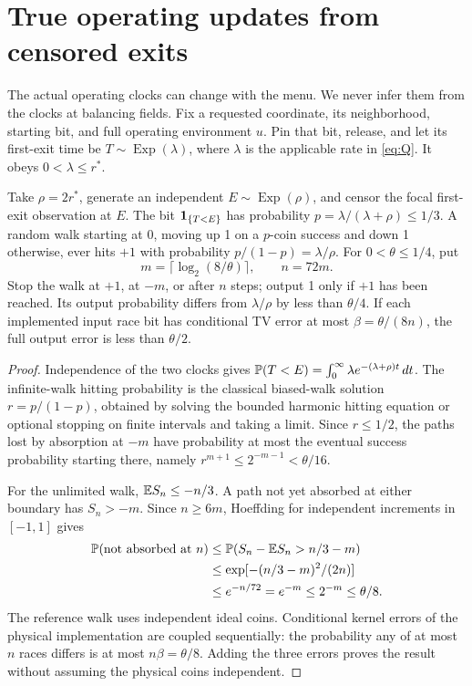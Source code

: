 \section{True operating updates from censored exits}

The actual operating clocks can change with the menu. We never infer them
from the clocks at balancing fields. Fix a requested coordinate, its
neighborhood, starting bit, and full operating environment $u$. Pin that
bit, release, and let its first-exit time be $T\sim\operatorname{Exp}(\lambda)$,
where $\lambda$ is the applicable rate in \eqref{eq:Q}. It obeys
$0<\lambda\le r^*$.

\begin{lemma}\label{lem:walk}
Take $\rho=2r^*$, generate an independent
$E\sim\operatorname{Exp}(\rho)$, and censor the focal first-exit observation
at $E$. The bit $\mathbf 1_{\{T<E\}}$ has probability
$p=\lambda/(\lambda+\rho)\le1/3$.
A random walk starting at 0, moving up 1 on a $p$-coin success and down 1
otherwise, ever hits $+1$ with probability
$p/(1-p)=\lambda/\rho$.
For $0<\theta\le1/4$, put
\[
 m=\lceil\log_2(8/\theta)\rceil,\qquad n=72m .
\]
Stop the walk at $+1$, at $-m$, or after $n$ steps; output 1 only if $+1$
has been reached. Its output probability differs from $\lambda/\rho$ by
less than $\theta/4$. If each implemented input race bit has conditional
TV error at most $\beta=\theta/(8n)$, the full output error is less than
$\theta/2$.
\end{lemma}
\begin{proof}
Independence of the two clocks gives
$\mathbb P(T<E)=\int_0^\infty\lambda e^{-(\lambda+\rho)t}\,dt$.
The infinite-walk hitting probability is the classical biased-walk solution
$r=p/(1-p)$, obtained by solving the bounded harmonic hitting equation or
optional stopping on finite intervals and taking a limit. Since $r\le1/2$,
the paths lost by absorption at $-m$ have probability at most the eventual
success probability starting there, namely $r^{m+1}\le2^{-m-1}<\theta/16$.

For the unlimited walk, $\mathbb E S_n\le-n/3$. A path not yet absorbed at either
boundary has $S_n>-m$. Since $n\ge6m$, Hoeffding for independent increments
in $[-1,1]$ gives
\begin{align*}
 \mathbb P(\hbox{not absorbed at }n)
 &\le\mathbb P(S_n-\mathbb E S_n>n/3-m)\\
 &\le\exp[-(n/3-m)^2/(2n)]\\
 &\le e^{-n/72}=e^{-m}\le2^{-m}\le\theta/8 .
\end{align*}
The reference walk uses independent ideal coins. Conditional kernel errors
of the physical implementation are coupled sequentially: the probability
any of at most $n$ races differs is at most $n\beta=\theta/8$.
Adding the three errors proves the result without assuming the physical
coins independent.
\end{proof}

